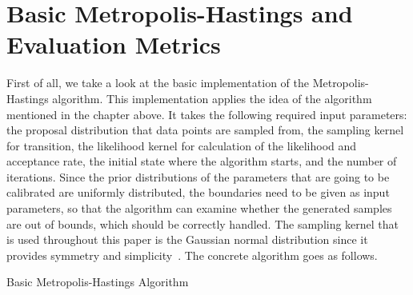 \section{Basic Metropolis-Hastings and Evaluation Metrics}
First of all, we take a look at the basic implementation of the Metropolis-Hastings algorithm. This implementation applies the idea of the algorithm mentioned in the chapter above. It takes the following required input parameters: the proposal distribution that data points are sampled from, the sampling kernel for transition, the likelihood kernel for calculation of the likelihood and acceptance rate, the initial state where the algorithm starts, and the number of iterations. Since the prior distributions of the parameters that are going to be calibrated are uniformly distributed, the boundaries need to be given as input parameters, so that the algorithm can examine whether the generated samples are out of bounds, which should be correctly handled. The sampling kernel that is used throughout this paper is the Gaussian normal distribution since it provides symmetry and simplicity~\cite{gaussian_distribution_property}. The concrete algorithm goes as follows.
\begin{algorithm}[H]
\BlankLine


\caption{Basic Metropolis-Hastings Algorithm}
\end{algorithm}

